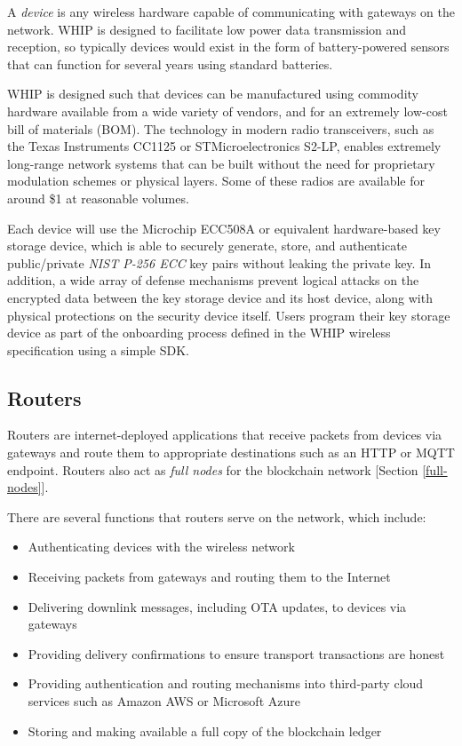 \documentclass[10pt, nonatbib, nocopyrightspace, reprint]{sigplanconf}
\begin{document}
A \emph{device} is any wireless hardware capable of communicating with gateways on the network. WHIP is designed to facilitate low power data transmission and reception, so typically devices would exist in the form of battery-powered sensors that can function for several years using standard batteries.

WHIP is designed such that devices can be manufactured using commodity hardware available from a wide variety of vendors, and for an extremely low-cost bill of materials (BOM). The technology in modern radio transceivers, such as the Texas Instruments CC1125 or STMicroelectronics S2-LP, enables extremely long-range network systems that can be built without the need for proprietary modulation schemes or physical layers. Some of these radios are available for around \$1 at reasonable volumes.

Each device will use the Microchip ECC508A or equivalent hardware-based key storage device, which is able to securely generate, store, and authenticate public/private \emph{NIST P-256 ECC} \cite{nist} key pairs without leaking the private key. In addition, a wide array of defense mechanisms prevent logical attacks on the encrypted data between the key storage device and its host device, along with physical protections on the security device itself. Users program their key storage device as part of the onboarding process defined in the WHIP wireless specification using a simple SDK\@.

\subsection{Routers}

Routers are internet-deployed applications that receive packets from devices via gateways and route them to appropriate destinations such as an HTTP or MQTT endpoint. Routers also act as \emph{full nodes} for the blockchain network [Section \ref{full-nodes}].

There are several functions that routers serve on the network, which include:

\begin{itemize}
    \item Authenticating devices with the wireless network
    \item Receiving packets from gateways and routing them to the Internet
    \item Delivering downlink messages, including OTA updates, to devices via gateways
    \item Providing delivery confirmations to ensure transport transactions are honest
    \item Providing authentication and routing mechanisms into third-party cloud services such as Amazon AWS or Microsoft Azure
    \item Storing and making available a full copy of the blockchain ledger
\end{itemize}
\end{document}
